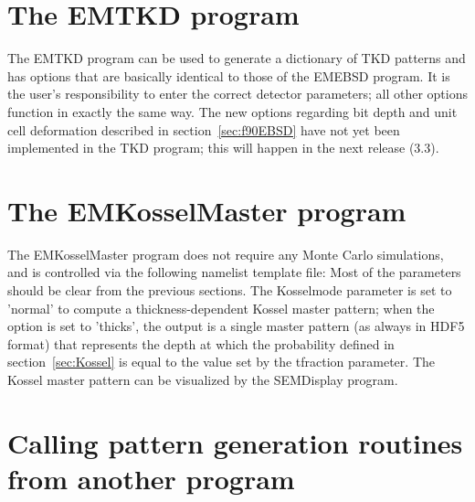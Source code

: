 \documentclass[DIV=calc, paper=letter, fontsize=11pt]{scrartcl}	 %
\begin{document}
\section{The \protect\textsf{EMTKD} program\label{sec:f90TKD}}
The \textsf{EMTKD} program can be used to generate a dictionary of TKD patterns and has options that are basically identical to 
those of the \textsf{EMEBSD} program.  It is the user's responsibility to enter the correct detector parameters; all other options
function in exactly the same way.  The new options regarding bit depth and unit cell deformation described in section~\ref{sec:f90EBSD}
have not yet been implemented in the TKD program; this will happen in the next release (3.3).


\section{The \protect\textsf{EMKosselMaster} program\label{sec:f90Kossel}}
The \textsf{EMKosselMaster} program does not require any Monte Carlo simulations, and is controlled via
the following namelist template file:
Most of the parameters should be clear from the previous sections.  The \textsf{Kosselmode} parameter is set to 
\textsf{'normal'} to compute a thickness-dependent Kossel master pattern; when the option is set to \textsf{'thicks'},
the output is a single master pattern (as always in HDF5 format) that represents the depth at which the probability 
defined in section~\ref{sec:Kossel} is equal to the value set by the \textsf{tfraction} parameter.  The Kossel master
pattern can be visualized by the \textsf{SEMDisplay} program.




\section{Calling pattern generation routines from another program\label{sec:external}}
\end{document}
